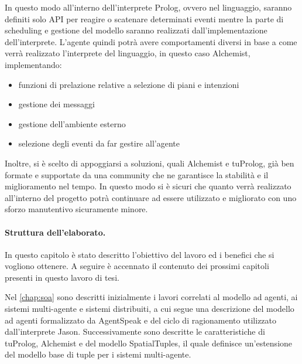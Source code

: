 In questo modo all'interno dell'interprete Prolog, ovvero nel linguaggio, saranno definiti solo API per reagire o scatenare determinati eventi mentre la parte di scheduling e gestione del modello saranno realizzati dall'implementazione dell'interprete.
L'agente quindi potrà avere comportamenti diversi in base a come verrà realizzato l'interprete del linguaggio, in questo caso Alchemist, implementando:
\begin{itemize}
\item funzioni di prelazione relative a selezione di piani e intenzioni
\item gestione dei messaggi
\item gestione dell'ambiente esterno
\item selezione degli eventi da far gestire all'agente
\end{itemize}

Inoltre, si è scelto di appoggiarsi a soluzioni, quali Alchemist e tuProlog, già ben formate e supportate da una community che ne garantisce la stabilità e il miglioramento nel tempo.
In questo modo si è sicuri che quanto verrà realizzato all'interno del progetto potrà continuare ad essere utilizzato e migliorato con uno sforzo manutentivo sicuramente minore.

\paragraph{Struttura dell'elaborato.}
In questo capitolo è stato descritto l'obiettivo del lavoro ed i benefici che si vogliono ottenere.
A seguire è accennato il contenuto dei prossimi capitoli presenti in questo lavoro di tesi.

Nel \cref{chap:soa} sono descritti inizialmente i lavori correlati al modello ad agenti, ai sistemi multi-agente e sistemi distribuiti, a cui segue una descrizione del modello ad agenti formalizzato da AgentSpeak e del ciclo di ragionamento utilizzato dall'interprete Jason.
Successivamente sono descritte le caratteristiche di tuProlog, Alchemist e del modello SpatialTuples, il quale definisce un'estensione del modello base di tuple per i sistemi multi-agente.

